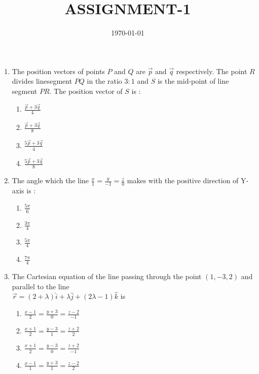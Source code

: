 \documentclass{article}
\title{ASSIGNMENT-1}
\date{\today}
\begin{document}
\begin{enumerate}
		\section{VECTOR GRAPHS}
\item The position vectors of points $P$ and $Q$ are $\vec{p}$ and $\vec{q}$ respectively. The point $R$ divides linesegment $PQ$ in the ratio $3 \colon 1$ and $S$ is the mid-point of line segment $PR$. The position vector of $S$ is :
        \begin{enumerate}[label=(\Alph*)]
                \item $\frac{\vec{p} + 3\vec{q}}{4}$
                \item $\frac{\vec{p} + 3\vec{q}}{8}$
                \item $\frac{5\vec{p} + 3\vec{q}}{4}$
                \item $\frac{5\vec{p} + 3\vec{q}}{8}$
        \end{enumerate}

                                \item The angle which the line $\frac{x}{1} = \frac{y}{-1} = \frac{z}{0} $ makes with the positive direction of Y-axis is :
                                        \begin{enumerate}[label=(\Alph*)]
                                                \item $\frac{5\pi}{6}$
                                                \item $\frac{3\pi}{4}$
                                                \item $\frac{5\pi}{4}$
                                                \item $\frac{7\pi}{4}$
                                        \end{enumerate}

                                \item The Cartesian equation of the line passing through the point $(1,-3,2)$ and parallel to the line\\
                                        $\vec{r} = (2+\lambda)\hat{i} + \lambda \hat{j} + (2\lambda-1)\hat{k}$ is
\begin{enumerate}[label=(\Alph*)]
        \item \(\frac{x-1}{2} = \frac{y+3}{0} = \frac{z-2}{-1}\)
        \item \(\frac{x+1}{2} = \frac{y-3}{1} = \frac{z+2}{2}\)
        \item \(\frac{x+1}{2} = \frac{y-3}{0} = \frac{z+2}{-1}\)
    \item \(\frac{x-1}{1} = \frac{y+3}{1} = \frac{z-2}{2}\)
\end{enumerate}
\end{enumerate}
\end{document}
